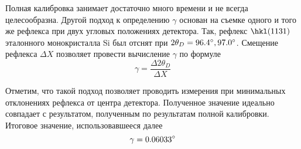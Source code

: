 Полная калибровка занимает достаточно много времени и не всегда целесообразна.
Другой подход к определению $\gamma$ основан на съемке одного и того же рефлекса при двух угловых положениях детектора.
Так, рефлекс $\hkl(11 3 1)$ эталонного монокристалла Si был отснят при $2\theta_D = 96.4^\circ, 97.0^\circ$.
Смещение рефлекса $\Delta X$ позволяет провести вычисление $\gamma$ по формуле
\begin{equation} \label{eq:gamma_delta}
    \gamma = \frac{\Delta 2\theta_D}{\Delta X}
\end{equation}

Отметим, что такой подход позволяет проводить измерения при минимальных отклонениях рефлекса от центра детектора.
Полученное значение идеально совпадает с результатом, полученным по результатам полной калибровки.
Итоговое значение, использовавшееся далее
\[ \gamma = 0.06033^\circ \]
